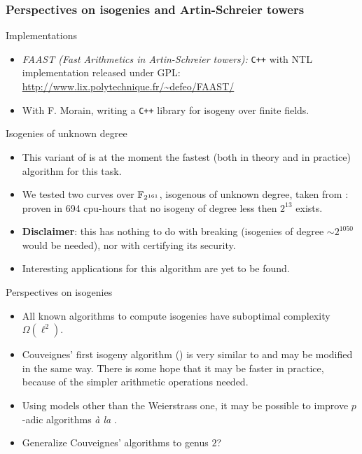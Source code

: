 \documentclass[10pt,usepdftitle=false]{beamer}
\begin{document}
\begin{frame}[allowframebreaks]
  \frametitle{Perspectives on isogenies and Artin-Schreier towers}
  
  \begin{block}{Implementations}
    \begin{itemize}
    \item \emph{FAAST (Fast Arithmetics in Artin-Schreier towers):}
      \texttt{C++} with NTL implementation released under GPL:
      \url{http://www.lix.polytechnique.fr/~defeo/FAAST/}
    \item With F. Morain, writing a \texttt{C++} library for isogeny
      over finite fields.
    \end{itemize}
  \end{block}

  \begin{block}{Isogenies of unknown degree}
    \begin{itemize}
    \item This variant of \cite{couveignes96} is at the moment the
      fastest (both in theory and in practice) algorithm for this
      task.
    \item We tested two curves over $\mathbb{F}_{2^{161}}$, isogenous of
      unknown degree, taken from \cite{teske06}: proven in 694
      cpu-hours that no isogeny of degree less then $2^{13}$ exists.
    \item \textbf{Disclaimer}: this has nothing to do with breaking
      \cite{teske06} (isogenies of degree $\sim 2^{1050}$ would be
      needed), nor with certifying its security.
    \item Interesting applications for this algorithm are yet to be
      found.
    \end{itemize}
  \end{block}  

  \begin{block}{Perspectives on isogenies}
    \begin{itemize}
    \item All known algorithms to compute isogenies have suboptimal
      complexity $\Omega(\ell^2)$.
    \item Couveignes' first isogeny algorithm (\cite{couveignes94}) is
      very similar to \cite{couveignes96} and may be modified in the
      same way. There is some hope that it may be faster in practice,
      because of the simpler arithmetic operations needed.
    \item Using models other than the Weierstrass one, it may be
      possible to improve $p$-adic algorithms \textit{à la}
      \cite{lercier+sirvent08}.
    \item Generalize Couveignes' algorithms to genus $2$?
    \end{itemize}
  \end{block}
\end{frame}
\end{document}
